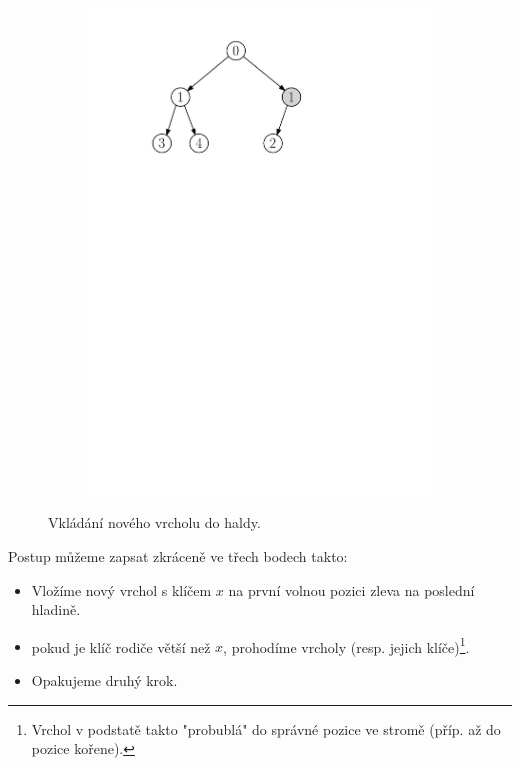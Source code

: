 \begin{figure}[h]
\begin{subfigure}{7cm}
    \end{subfigure}
    \begin{subfigure}{7cm}
        \includegraphics[scale=.5]{01-grafalgo/images/ch01_vkladani_2}
    \end{subfigure}
    \caption{Vkládání nového vrcholu do haldy.}
    \label{fig:vkladani_vrcholu_halda}
\end{figure}
Postup můžeme zapsat zkráceně ve třech bodech takto:
\begin{itemize}
    \item Vložíme nový vrchol s klíčem $x$ na první volnou pozici zleva na poslední hladině.
    \item pokud je klíč rodiče větší než $x$, prohodíme vrcholy (resp. jejich klíče)\footnote{Vrchol v podstatě takto "probublá" do správné pozice ve stromě (příp. až do pozice kořene).}.
    \item Opakujeme druhý krok.
\end{itemize}

